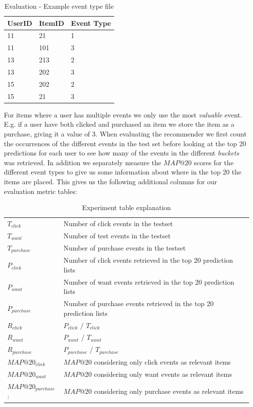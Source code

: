 \begin{table}[H]
\centering
\begin{tabular}{*{3}l}
\toprule
UserID	&	ItemID	 &  Event Type  \\ \midrule
11		&	21		 &	1			\\
11		&	101		 &	3			\\
13		&	213		 &	2			\\
13		&	202		 &  3			\\
15		&	202		 &  2			\\
15		&	21		 &  3			\\
\bottomrule
\end{tabular}
\caption{Evaluation - Example event type file}
\label{table:event-type}
\end{table}

For items where a user has multiple events we only use the most \emph{valuable} event. E.g. if a user have both clicked
and purchased an item we store the item as a purchase, giving it a value of 3. When evaluating the recommender we first count the
occurrences of the different events in the test set before looking at the top 20 predictions for each user to see how many of the events in the
different \emph{buckets} was retrieved. In addition we separately measure the $MAP@20$ scores for the different event types to give us some information
about where in the top 20 the items are placed. This gives us the following additional columns for our evaluation metric tables:

\begin{table}[H]
    \begin{tabular}{ll}
    \toprule
    $T_{click}$             &   Number of click events in the testset \\
    $T_{want}$              &   Number of test events in the testset \\
    $T_{purchase}$          &   Number of purchase events in the testset \\
    $P_{click}$             &   Number of click events retrieved in the top 20 prediction lists \\
    $P_{want}$              &   Number of want events retrieved in the top 20 prediction lists \\
    $P_{purchase}$          &   Number of purchase events retrieved in the top 20 prediction lists \\
    $R_{click}$             &   $P_{click}$ / $T_{click}$ \\
    $R_{want}$              &   $P_{want}$ / $T_{want}$  \\
    $R_{purchase}$          &   $P_{purchase}$ / $T_{purchase}$ \\
    $MAP@20_{click}$        &   $MAP@20$ considering only click events as relevant items \\
    $MAP@20_{want}$         &   $MAP@20$ considering only want events as relevant items \\
    $MAP@20_{purchase}$:    &   $MAP@20$ considering only purchase events as relevant items \\
    \bottomrule
    \end{tabular}
\caption{Experiment table explanation}
\label{metric-explanation}
\end{table}

